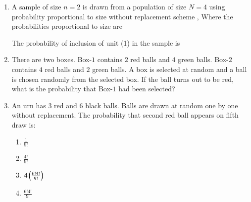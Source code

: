 \begin{enumerate}[label=\thesection.\arabic*.,ref=\thesection.\theenumi]
\begin{enumerate}
    \end{enumerate}    
%
\solution

%
%
\item A sample of size $n =2$ is drawn from a population of size $N=4$ using probability proportional to size without replacement scheme , Where the probabilities proportional to size are
\begin{table}[h!]
   \caption*{Table : Probability vs Size}
\end{table}  
The probability of inclusion of unit (1) in the sample is 
\begin{enumerate}
%

\end{enumerate}
%
\solution

%
%
\item There are two boxes. Box-$1$ contains $2$ red balls and $4$ green balls. Box-$2$ contains $4$ red balls and $2$ green balls. A box is selected at random and a ball is chosen randomly from the selected box. If the ball turns out to be red, what is the probability that Box-$1$ had been selected?
%
\solution

%
\item An urn has 3 red and 6 black balls. Balls are drawn at random one by one without replacement. The probability that second red ball appears on fifth draw is: \\
\begin{enumerate}
    \item $\frac{1}{9!}$
    \newline
    \item $\frac{4!}{9!}$
    \newline
    \item $4\left(\frac{6!4!}{9!}\right)$
    \newline
    \item $\frac{6!4!}{9!}$
\end{enumerate}
%
%
\solution

%


\end{enumerate}

